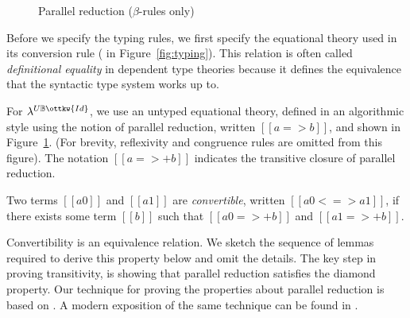 \documentclass[acmsmall,screen=true,
\ifpublic review=false\else,review=true\fi
  ,anonymous=\ifanonymous true\else false\fi]{acmart}
\newcommand{\lang}{$\lambda^{U\mathbb{B}\ottkw{Id}}$\xspace}
\newcommand{\scw}[1]{}
\begin{document}
\begin{figure}[h]
\begin{minipage}{0.9\textwidth}
\end{minipage}
\caption{Parallel reduction ($\beta$-rules only) }
\label{fig:par}
\end{figure}

Before we specify the typing rules, we first specify the equational theory
used in its conversion rule ( in Figure~\ref{fig:typing}). This
relation is often called \textit{definitional equality} in dependent type theories
because it defines the equivalence that the syntactic type system works
up to.

For \lang{}, we use an untyped equational theory, defined in an algorithmic
style using the notion of parallel reduction, written $[[a => b]]$, and shown
in Figure~\ref{fig:par}. (For brevity, reflexivity and congruence rules are
omitted from this figure). The notation $[[a =>+ b]]$ indicates the transitive
closure of parallel reduction.

\begin{definition}[Convertibility]
  Two terms $[[a0]]$ and $[[a1]]$ are \emph{convertible}, written
  $[[a0 <=> a1]]$, if there exists some term $[[b]]$ such that $[[a0 =>+ b]]$
  and $[[a1 =>+ b]]$.
\end{definition}

Convertibility is an equivalence relation. We sketch the sequence of lemmas
required to derive this property below and omit the details. The key step in
proving transitivity, is showing that parallel reduction satisfies the diamond
property.  Our technique for proving the properties about parallel reduction
is based on \citet{takahashi-parallel-reduction}. A modern exposition of the
same technique can be found in \citet{plfa22.08}.
\end{document}
